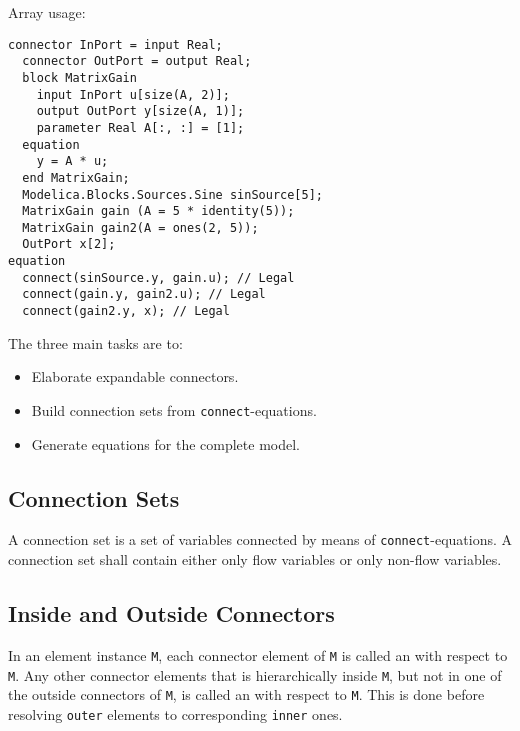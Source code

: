 \begin{example}
Array usage:
\begin{lstlisting}[language=modelica]
  connector InPort = input Real;
  connector OutPort = output Real;
  block MatrixGain
    input InPort u[size(A, 2)];
    output OutPort y[size(A, 1)];
    parameter Real A[:, :] = [1];
  equation
    y = A * u;
  end MatrixGain;
  Modelica.Blocks.Sources.Sine sinSource[5];
  MatrixGain gain (A = 5 * identity(5));
  MatrixGain gain2(A = ones(2, 5));
  OutPort x[2];
equation
  connect(sinSource.y, gain.u); // Legal
  connect(gain.y, gain2.u); // Legal
  connect(gain2.y, x); // Legal
\end{lstlisting}
\end{example}

The three main tasks are to:
\begin{itemize}
\item
  Elaborate expandable connectors.
\item
  Build connection sets from \lstinline!connect!-equations.
\item
  Generate equations for the complete model.
\end{itemize}

\subsection{Connection Sets}\label{connection-sets}

A connection set is a set of variables connected by means of \lstinline!connect!-equations.
A connection set shall contain either only flow variables or only non-flow variables.

\subsection{Inside and Outside Connectors}\label{inside-and-outside-connectors}

In an element instance \lstinline!M!, each connector element of \lstinline!M! is called an  with respect to \lstinline!M!.
Any other connector elements that is hierarchically inside \lstinline!M!, but not in one of the outside connectors of \lstinline!M!, is called an  with respect to \lstinline!M!.
This is done before resolving \lstinline!outer! elements to corresponding \lstinline!inner! ones.


